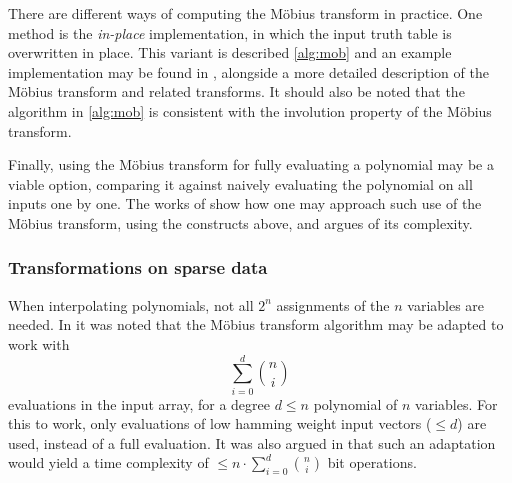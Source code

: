 There are different ways of computing the Möbius transform in practice. One method is the \textit{in-place} implementation, in which the input truth table is overwritten in place. This variant is described \cref{alg:mob} and an example implementation may be found in \cite{joux2009algorithmic}, alongside a more detailed description of the Möbius transform and related transforms. It should also be noted that the algorithm in \cref{alg:mob} is consistent with the involution property of the Möbius transform.

Finally, using the Möbius transform for fully evaluating a polynomial may be a viable option, comparing it against naively evaluating the polynomial on all inputs one by one. The works of \cite{fse-2011-23547} show how one may approach such use of the Möbius transform, using the constructs above, and argues of its complexity.

\subsubsection{Transformations on sparse data} \label{sec:prereq:poly_interp:sparse}
When interpolating polynomials, not all $2^n$ assignments of the $n$ variables are needed. In \cite{eurocrypt-2021-30841} it was noted that the Möbius transform algorithm may be adapted to work with 
$$
    \sum_{i = 0}^{d} \binom{n}{i}
$$
evaluations in the input array, for a degree $d \leq n$ polynomial of $n$ variables. For this to work, only evaluations of low hamming weight input vectors ($\leq d$) are used, instead of a full evaluation. It was also argued in \cite{eurocrypt-2021-30841} that such an adaptation would yield a time complexity of $\leq n \cdot \sum_{i = 0}^{d}\binom{n}{i}$ bit operations.

\newpage
